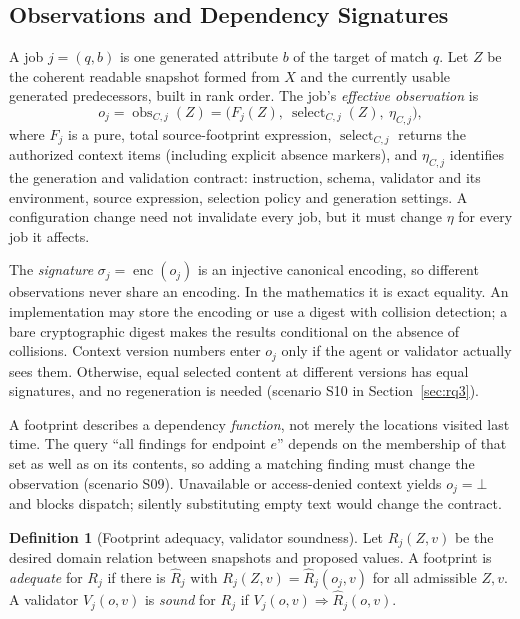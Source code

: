\documentclass[10pt,journal,compsoc]{IEEEtran}
\theoremstyle{plain}
\theoremstyle{definition}
\newtheorem{definition}{Definition}
\newcommand{\Sig}{\sigma}
\newcommand{\obs}{\operatorname{obs}}
\newcommand{\nodata}{\bot}
\begin{document}
\subsection{Observations and Dependency Signatures}
A job $j=(q,b)$ is one generated attribute $b$ of the target of match $q$. Let $Z$ be the coherent readable snapshot formed from $X$ and the currently usable generated predecessors, built in rank order. The job's \emph{effective observation} is
\begin{equation}\label{eq:obs}
o_j=\obs_{C,j}(Z)=\bigl(F_j(Z),\ \operatorname{select}_{C,j}(Z),\ \eta_{C,j}\bigr),
\end{equation}
where $F_j$ is a pure, total source-footprint expression, $\operatorname{select}_{C,j}$ returns the authorized context items (including explicit absence markers), and $\eta_{C,j}$ identifies the generation and validation contract: instruction, schema, validator and its environment, source expression, selection policy and generation settings. A configuration change need not invalidate every job, but it must change $\eta$ for every job it affects.

The \emph{signature} $\Sig_j=\operatorname{enc}(o_j)$ is an injective canonical encoding, so different observations never share an encoding. In the mathematics it is exact equality. An implementation may store the encoding or use a digest with collision detection; a bare cryptographic digest makes the results conditional on the absence of collisions. Context version numbers enter $o_j$ only if the agent or validator actually sees them. Otherwise, equal selected content at different versions has equal signatures, and no regeneration is needed (scenario S10 in Section~\ref{sec:rq3}).

A footprint describes a dependency \emph{function}, not merely the locations visited last time. The query ``all findings for endpoint $e$'' depends on the membership of that set as well as on its contents, so adding a matching finding must change the observation (scenario S09). Unavailable or access-denied context yields $o_j=\nodata$ and blocks dispatch; silently substituting empty text would change the contract.

\begin{definition}[Footprint adequacy, validator soundness]\label{def:adequate}
Let $R_j(Z,v)$ be the desired domain relation between snapshots and proposed values. A footprint is \emph{adequate} for $R_j$ if there is $\widehat R_j$ with $R_j(Z,v)=\widehat R_j(o_j,v)$ for all admissible $Z,v$. A validator $V_j(o,v)$ is \emph{sound} for $R_j$ if $V_j(o,v)\Rightarrow\widehat R_j(o,v)$.
\end{definition}
\end{document}
